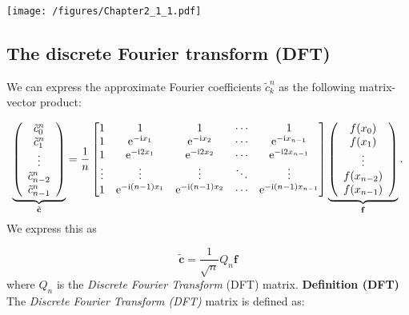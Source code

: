 \documentclass[12pt,landscape]{article}
\begin{document}
{\texttt{[image: /figures/Chapter2\_1\_1.pdf]}

\subsection{The discrete Fourier transform (DFT)}
We can express the approximate Fourier coefficients $\tilde{c}^n_k$ as the following matrix-vector product:

\[
\underbrace{\left(
\begin{array}{c}
\tilde{c}^n_0 \\
\tilde{c}^n_1 \\
\vdots \\
\tilde{c}^n_{n-2} \\
\tilde{c}^n_{n-1}
\end{array}
\right)}_{\tilde{\mathbf{c}}} = 
{1 \over n} \begin{bmatrix} 1 & 1 & 1&  \ensuremath{\cdots} & 1 \\
                                    1 & {\rm e}^{-{\rm i} x_1} & {\rm e}^{-{\rm i} x_2} & \ensuremath{\cdots} & {\rm e}^{-{\rm i} x_{n-1}} \\
                                    1 & {\rm e}^{-{\rm i} 2 x_1} & {\rm e}^{-{\rm i} 2 x_2} & \ensuremath{\cdots} & {\rm e}^{-{\rm i} 2x_{n-1}} \\
                                    \ensuremath{\vdots} & \ensuremath{\vdots} & \ensuremath{\vdots} & \ensuremath{\ddots} & \ensuremath{\vdots} \\
                                    1 & {\rm e}^{-{\rm i} (n-1) x_1} & {\rm e}^{-{\rm i} (n-1) x_2} & \ensuremath{\cdots} & {\rm e}^{-{\rm i} (n-1) x_{n-1}}
\end{bmatrix} 
\underbrace{\left(
\begin{array}{c}
f(x_0) \\
f(x_1) \\
\vdots \\
f(x_{n-2}) \\
f(x_{n-1})
\end{array}
\right)}_{\mathbf{f}}.
\]
We express this as

\[
\tilde{\mathbf{c}} = \frac{1}{\sqrt{n}}Q_{n}\mathbf{f}
\]
where $Q_n$ is the \emph{Discrete Fourier Transform} (DFT) matrix.
\newpage
\textbf{Definition (DFT)} The \emph{Discrete Fourier Transform (DFT)} matrix is defined as:


}
\end{document}
